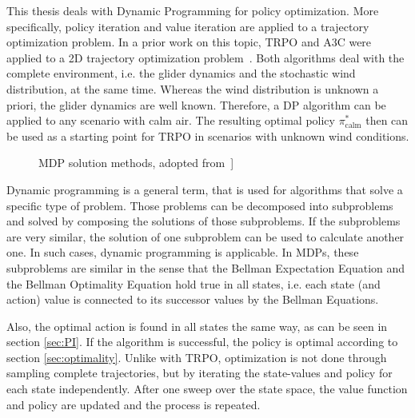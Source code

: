 This thesis deals with Dynamic Programming for policy optimization. More specifically, policy iteration and value iteration are applied to a trajectory optimization problem. In a prior work on this topic, TRPO and A3C were applied to a 2D trajectory optimization problem~\cite{Zuern2017}. Both algorithms deal with the complete environment, i.e. the glider dynamics and the stochastic wind distribution, at the same time. Whereas the wind distribution is unknown a priori, the glider dynamics are well known. Therefore, a DP algorithm can be applied to any scenario with calm air. The resulting optimal policy $\pi^*_{\text{calm}}$ then can be used as a starting point for TRPO in scenarios with unknown wind conditions.
\begin{figure}[h]
	\centering
	\caption{MDP solution methods, adopted from~\cite{Schulman2016}]}
	\label{fig:RLmethods} 
\end{figure}

Dynamic programming is a general term, that is used for algorithms that solve a specific type of problem. Those problems can be decomposed into subproblems and solved by composing the solutions of those subproblems. If the subproblems are very similar, the solution of one subproblem can be used to calculate another one. In such cases, dynamic programming is applicable. In MDPs, these subproblems are similar in the sense that the Bellman Expectation Equation and the Bellman Optimality Equation hold true in all states, i.e. each state (and action) value is connected to its successor values by the Bellman Equations.

Also, the optimal action is found in all states the same way, as can be seen in section \ref{sec:PI}. If the algorithm is successful, the policy is optimal according to section \ref{sec:optimality}. Unlike with TRPO, optimization is not done through sampling complete trajectories, but by iterating the state-values and policy for each state independently. After one sweep over the state space, the value function and policy are updated and the process is repeated.\bigbreak

